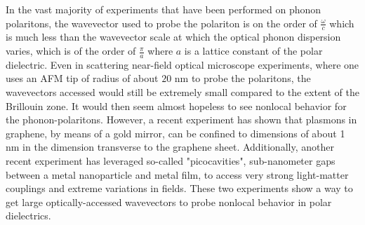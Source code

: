 \documentclass[superscriptaddress,reprint,prb]{revtex4-1}
\begin{document}
In the vast majority of experiments that have been performed on phonon polaritons, the wavevector used to probe the polariton is on the order of $\frac{\omega}{c}$ which is much less than the wavevector scale at which the optical phonon dispersion varies, which is of the order of $\frac{\pi}{a}$ where $a$ is a lattice constant of the polar dielectric.  Even in scattering near-field optical microscope experiments, where one uses an AFM tip of radius of about $20$ nm to probe the polaritons, the wavevectors accessed would still be extremely small compared to the extent of the Brillouin zone. It would then seem almost hopeless to see nonlocal behavior for the phonon-polaritons. However, a recent experiment \cite{iranzo2018probing} has shown that plasmons in graphene, by means of a gold mirror, can be confined to dimensions of about 1 nm in the dimension transverse to the graphene sheet. Additionally, another recent experiment \cite{benz2016single} has leveraged so-called "picocavities", sub-nanometer gaps between a metal nanoparticle and metal film, to access very strong light-matter couplings and extreme variations in fields. These two experiments show a way to get large optically-accessed wavevectors to probe nonlocal behavior in polar dielectrics.



 
\end{document}
